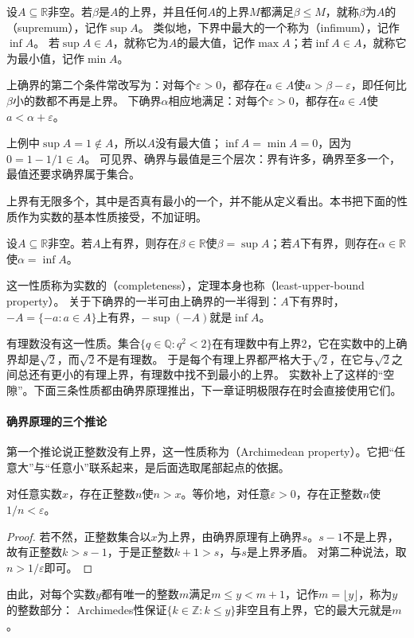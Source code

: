 \begin{definition}[上确界与下确界]
\label{def:ru-supremum}
设$A\subseteq\mathbb R$非空。若$\beta$是$A$的上界，并且任何$A$的上界$M$都满足$\beta\leq M$，就称$\beta$为$A$的（supremum），记作$\sup A$。
类似地，下界中最大的一个称为（infimum），记作$\inf A$。
若$\sup A\in A$，就称它为$A$的最大值，记作$\max A$；若$\inf A\in A$，就称它为最小值，记作$\min A$。
\end{definition}

上确界的第二个条件常改写为：对每个$\varepsilon>0$，都存在$a\in A$使$a>\beta-\varepsilon$，即任何比$\beta$小的数都不再是上界。
下确界$\alpha$相应地满足：对每个$\varepsilon>0$，都存在$a\in A$使$a<\alpha+\varepsilon$。

上例中$\sup A=1\notin A$，所以$A$没有最大值；$\inf A=\min A=0$，因为$0=1-1/1\in A$。
可见界、确界与最值是三个层次：界有许多，确界至多一个，最值还要求确界属于集合。

上界有无限多个，其中是否真有最小的一个，并不能从定义看出。本书把下面的性质作为实数的基本性质接受，不加证明。
\begin{theorem}[确界原理]
\label{thm:ru-least-upper-bound}
设$A\subseteq\mathbb R$非空。若$A$上有界，则存在$\beta\in\mathbb R$使$\beta=\sup A$；若$A$下有界，则存在$\alpha\in\mathbb R$使$\alpha=\inf A$。
\end{theorem}
这一性质称为实数的（completeness），定理本身也称（least-upper-bound property）。
关于下确界的一半可由上确界的一半得到：$A$下有界时，$-A=\{-a:a\in A\}$上有界，$-\sup(-A)$就是$\inf A$。

有理数没有这一性质。集合$\{q\in\mathbb Q:q^2<2\}$在有理数中有上界$2$，它在实数中的上确界却是$\sqrt2$，而$\sqrt2$不是有理数。
于是每个有理上界都严格大于$\sqrt2$，在它与$\sqrt2$之间总还有更小的有理上界，有理数中找不到最小的上界。
实数补上了这样的“空隙”。下面三条性质都由确界原理推出，下一章证明极限存在时会直接使用它们。

\paragraph{确界原理的三个推论}
第一个推论说正整数没有上界，这一性质称为（Archimedean property）。它把“任意大”与“任意小”联系起来，是后面选取尾部起点的依据。
\begin{theorem}[Archimedes性]
\label{thm:ru-archimedean}
对任意实数$x$，存在正整数$n$使$n>x$。等价地，对任意$\varepsilon>0$，存在正整数$n$使$1/n<\varepsilon$。
\end{theorem}
\begin{proof}
若不然，正整数集合以$x$为上界，由确界原理有上确界$s$。$s-1$不是上界，故有正整数$k>s-1$，于是正整数$k+1>s$，与$s$是上界矛盾。
对第二种说法，取$n>1/\varepsilon$即可。
\end{proof}
由此，对每个实数$y$都有唯一的整数$m$满足$m\leq y<m+1$，记作$m=\lfloor y\rfloor$，称为$y$的整数部分：
Archimedes性保证$\{k\in\mathbb Z:k\leq y\}$非空且有上界，它的最大元就是$m$。


